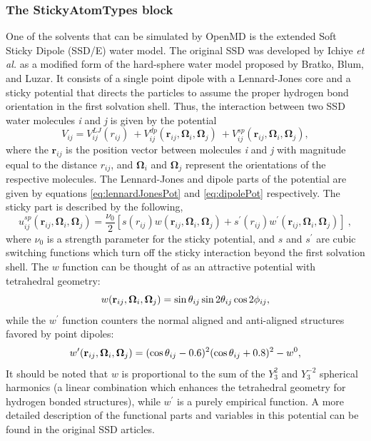 \documentclass[]{book}
\begin{document}
\subsubsection{\label{section:ffSticky}The StickyAtomTypes block}

One of the solvents that can be simulated by {\sc OpenMD} is the
extended Soft Sticky Dipole (SSD/E) water model.\cite{fennell04} The
original SSD was developed by Ichiye \emph{et
  al.}\cite{liu96:new_model} as a modified form of the hard-sphere
water model proposed by Bratko, Blum, and
Luzar.\cite{Bratko85,Bratko95} It consists of a single point dipole
with a Lennard-Jones core and a sticky potential that directs the
particles to assume the proper hydrogen bond orientation in the first
solvation shell. Thus, the interaction between two SSD water molecules
\emph{i} and \emph{j} is given by the potential
\begin{equation}
V_{ij} = 
	V_{ij}^{LJ} (r_{ij})\ + V_{ij}^{dp}
	(\mathbf{r}_{ij},\boldsymbol{\Omega}_i,\boldsymbol{\Omega}_j)\ +
	V_{ij}^{sp}
	(\mathbf{r}_{ij},\boldsymbol{\Omega}_i,\boldsymbol{\Omega}_j),
\label{eq:ssdPot}
\end{equation}
where the $\mathbf{r}_{ij}$ is the position vector between molecules
\emph{i} and \emph{j} with magnitude equal to the distance $r_{ij}$, and
$\boldsymbol{\Omega}_i$ and $\boldsymbol{\Omega}_j$ represent the
orientations of the respective molecules. The Lennard-Jones and dipole
parts of the potential are given by equations \ref{eq:lennardJonesPot}
and \ref{eq:dipolePot} respectively. The sticky part is described by
the following,
\begin{equation}
u_{ij}^{sp}(\mathbf{r}_{ij},\boldsymbol{\Omega}_i,\boldsymbol{\Omega}_j)=
	\frac{\nu_0}{2}[s(r_{ij})w(\mathbf{r}_{ij},
	\boldsymbol{\Omega}_i,\boldsymbol{\Omega}_j) +
	s^\prime(r_{ij})w^\prime(\mathbf{r}_{ij},
	\boldsymbol{\Omega}_i,\boldsymbol{\Omega}_j)]\ ,
\label{eq:stickyPot}
\end{equation}
where $\nu_0$ is a strength parameter for the sticky potential, and
$s$ and $s^\prime$ are cubic switching functions which turn off the
sticky interaction beyond the first solvation shell. The $w$ function
can be thought of as an attractive potential with tetrahedral
geometry:
\begin{equation}
w({\bf r}_{ij},{\bf \Omega}_i,{\bf \Omega}_j)=
	\sin\theta_{ij}\sin2\theta_{ij}\cos2\phi_{ij},
\label{eq:stickyW}
\end{equation}
while the $w^\prime$ function counters the normal aligned and
anti-aligned structures favored by point dipoles:
\begin{equation}
w^\prime({\bf r}_{ij},{\bf \Omega}_i,{\bf \Omega}_j)=
	(\cos\theta_{ij}-0.6)^2(\cos\theta_{ij}+0.8)^2-w^0,
\label{eq:stickyWprime}
\end{equation}
It should be noted that $w$ is proportional to the sum of the $Y_3^2$
and $Y_3^{-2}$ spherical harmonics (a linear combination which
enhances the tetrahedral geometry for hydrogen bonded structures),
while $w^\prime$ is a purely empirical function.  A more detailed
description of the functional parts and variables in this potential
can be found in the original SSD
articles.\cite{liu96:new_model,liu96:monte_carlo,chandra99:ssd_md,Ichiye03}
\end{document}
